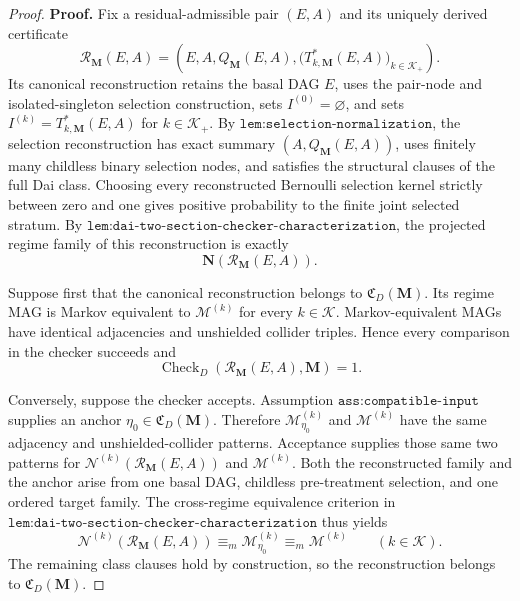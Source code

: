 \documentclass{article}
\begin{document}
\begin{proof}
\textbf{Proof.}
Fix a residual-admissible pair \((E,A)\) and its uniquely derived certificate
\[
\mathcal R_{\mathbf M}(E,A)
=\left(E,A,Q_{\mathbf M}(E,A),
\bigl(T^*_{k,\mathbf M}(E,A)\bigr)_{k\in\mathcal K_+}\right).
\]
Its canonical reconstruction retains the basal DAG \(E\), uses the pair-node and isolated-singleton selection construction, sets \(I^{(0)}=\varnothing\), and sets \(I^{(k)}=T^*_{k,\mathbf M}(E,A)\) for \(k\in\mathcal K_+\).  By \(\texttt{lem:selection-normalization}\), the selection reconstruction has exact summary \((A,Q_{\mathbf M}(E,A))\), uses finitely many childless binary selection nodes, and satisfies the structural clauses of the full Dai class.  Choosing every reconstructed Bernoulli selection kernel strictly between zero and one gives positive probability to the finite joint selected stratum.  By \(\texttt{lem:dai-two-section-checker-characterization}\), the projected regime family of this reconstruction is exactly
\[
\mathbf N(\mathcal R_{\mathbf M}(E,A)).
\]

Suppose first that the canonical reconstruction belongs to \(\mathfrak C_D(\mathbf M)\).  Its regime MAG is Markov equivalent to \(\mathcal M^{(k)}\) for every \(k\in\mathcal K\).  Markov-equivalent MAGs have identical adjacencies and unshielded collider triples.  Hence every comparison in the checker succeeds and
\[
\operatorname{Check}_{D}(\mathcal R_{\mathbf M}(E,A),\mathbf M)=1.
\]

Conversely, suppose the checker accepts.  Assumption \(\texttt{ass:compatible-input}\) supplies an anchor \(\eta_0\in\mathfrak C_D(\mathbf M)\).  Therefore \(\mathcal M_{\eta_0}^{(k)}\) and \(\mathcal M^{(k)}\) have the same adjacency and unshielded-collider patterns.  Acceptance supplies those same two patterns for \(\mathcal N^{(k)}(\mathcal R_{\mathbf M}(E,A))\) and \(\mathcal M^{(k)}\).  Both the reconstructed family and the anchor arise from one basal DAG, childless pre-treatment selection, and one ordered target family.  The cross-regime equivalence criterion in \(\texttt{lem:dai-two-section-checker-characterization}\) thus yields
\[
\mathcal N^{(k)}(\mathcal R_{\mathbf M}(E,A))
\equiv_m\mathcal M_{\eta_0}^{(k)}
\equiv_m\mathcal M^{(k)}
\qquad(k\in\mathcal K).
\]
The remaining class clauses hold by construction, so the reconstruction belongs to \(\mathfrak C_D(\mathbf M)\).


\end{proof}
\end{document}
